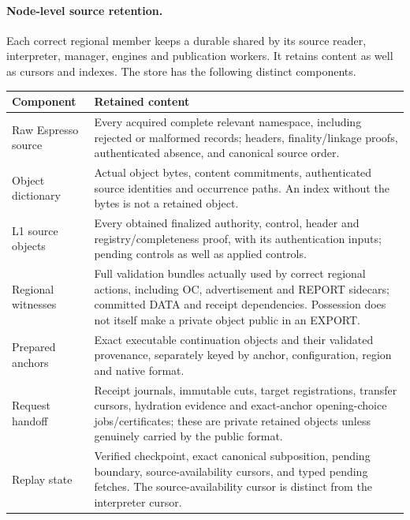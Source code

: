 \paragraph{Node-level source retention.}
\label{sec:source-step}
\label{sec:source-retention}
Each correct regional member keeps a durable  shared
by its source reader, interpreter, manager, engines and publication
workers. It retains content as well as cursors and indexes. The store
has the following distinct components.
\begin{table}[htbp]\centering\small
\begin{tabularx}{\linewidth}{@{}>{\raggedright\arraybackslash}p{.24\linewidth}Y@{}}\toprule
Component & Retained content\\\midrule
Raw Espresso source & Every acquired complete relevant namespace,
including rejected or malformed records; headers, finality/linkage
proofs, authenticated absence, and canonical source order.\\
Object dictionary & Actual object bytes, content commitments,
authenticated source identities and occurrence paths. An index without
the bytes is not a retained object.\\
L1 source objects & Every obtained finalized authority, control,
header and registry/completeness proof, with its authentication inputs;
pending controls as well as applied controls.\\
Regional witnesses & Full validation bundles actually used by correct
regional actions, including OC, advertisement and REPORT sidecars;
committed DATA and receipt dependencies. Possession
does not itself make a private object public in an EXPORT.\\
Prepared anchors & Exact executable continuation objects and their
validated provenance, separately keyed by anchor, configuration,
region and native format.\\
Request handoff & Receipt journals, immutable cuts, target registrations,
transfer cursors, hydration evidence and exact-anchor opening-choice
jobs/certificates; these are private retained objects unless genuinely
carried by the public format.\\
Replay state & Verified checkpoint, exact canonical subposition,
pending boundary, source-availability cursors, and typed pending fetches.
The source-availability cursor is distinct from the interpreter cursor.\\\bottomrule
\end{tabularx}
\end{table}

